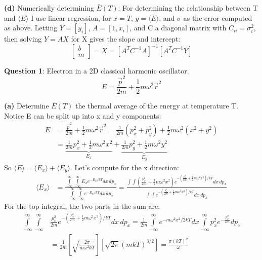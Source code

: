 \documentclass{article}
\begin{document}
\textbf{(d)} Numerically determining $\bar{E}(T)$: For determining the relationship between T and $\langle E\rangle$ I use linear regression, for $x=T$, $y=\langle E\rangle$, and $\sigma$ as the error computed as above. Letting $Y = [y_i]$, $A = [1, x_i]$, and C a diagonal matrix with $C_{ii} = \sigma_{i}^{2}$, then solving $Y = AX$ for X gives the slope and intercept:
	\[\begin{bmatrix} b \\ m \end{bmatrix} = X = [A^T C^{-1} A]^{-1} [A^{T} C^{-1} Y] \]

\bigskip
\textbf{Question 1}: Electron in a 2D classical harmonic oscillator. 
	\[E = \frac{\vec{p}^2}{2m} + \frac{1}{2}m\omega^2 \vec{r}^2 \]

\textbf{(a)} Determine $\bar{E}(T)$ the thermal average of the energy at temperature T. \\

Notice E can be split up into x and y components:
\begin{align*}
	E &= \frac{\vec{p}^2}{2m} + \frac{1}{2}m\omega^2 \vec{r}^2 
	= \frac{1}{2m}(p_x^2 + p_y^2) + \frac{1}{2}m\omega^2 (x^2 + y^2) \\
	&= \underbrace{\frac{1}{2m}p_x^2 + \frac{1}{2}m\omega^2 x^2}_{E_x} 
	+ \underbrace{\frac{1}{2m}p_y^2 + \frac{1}{2}m\omega^2 y^2}_{E_y}
\end{align*}
So $\langle E \rangle = \langle E_x \rangle + \langle E_y \rangle$. Let's compute for the x direction:
\begin{align*}
	\langle E_x \rangle &= 
	\frac{\int\limits_{-\infty}^{\infty} \int\limits_{-\infty}^{\infty} E_x e^{-E_x/kT} dx \, dp_x}{\int\limits_{-\infty}^{\infty} \int\limits_{-\infty}^{\infty} e^{-E_x/kT} dx \, dp_x} 
	= \frac{\int\int (\frac{p_x^2}{2m} + \frac{1}{2}m\omega^2 x^2) e^{-(\frac{p_x^2}{2m} + \frac{1}{2}m\omega^2 x^2)/kT} dx \, dp_x}{\int\int e^{-(\frac{p_x^2}{2m} + \frac{1}{2}m\omega^2 x^2)/kT} dx \, dp_x}
\end{align*}
For the top integral, the two parts in the sum are:
\begin{align*}
	\int\limits_{-\infty}^{\infty} \int\limits_{-\infty}^{\infty} 
	&\frac{p_x^2}{2m} e^{-(\frac{p_x^2}{2m} + \frac{1}{2}m\omega^2 x^2)/kT} dx \, dp_x
	= \frac{1}{2m} \int\limits_{-\infty}^{\infty} e^{-m\omega^2 x^2/2kT} dx 
	\int\limits_{-\infty}^{\infty} p_x^2 e^{-\frac{p_x^2}{2m}} dp_x \\
	&= \frac{1}{2m} \left[ \sqrt{\frac{2\pi}{m\omega^2 kT}} \right] \left[\sqrt{2\pi} (mkT)^{3/2} \right] 
	= \frac{\pi (kT)^2}{\omega}
\end{align*}
\end{document}
